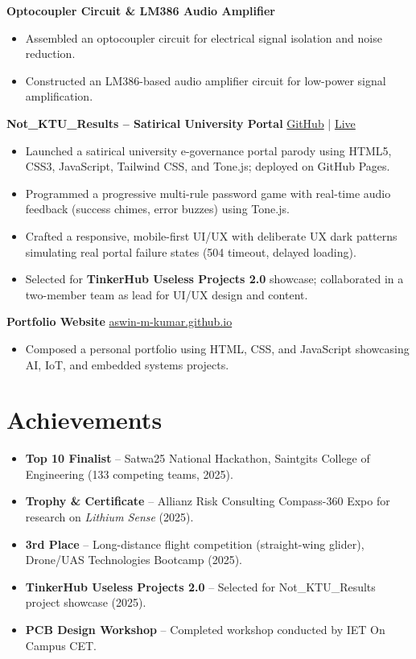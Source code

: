 \documentclass[a4paper,11pt]{article}
\begin{document}
\vspace{4pt}
\noindent
\textbf{Optocoupler Circuit \& LM386 Audio Amplifier}
\begin{itemize}
  \item Assembled an optocoupler circuit for electrical signal isolation and noise reduction.
  \item Constructed an LM386-based audio amplifier circuit for low-power signal amplification.
\end{itemize}

\vspace{4pt}
\noindent
\textbf{Not\_KTU\_Results -- Satirical University Portal} \hfill \href{https://github.com/aswin-m-kumar/Not_KTU_Results}{GitHub} \;|\; \href{https://aswin-m-kumar.github.io/Not_KTU_Results/}{Live}
\begin{itemize}
  \item Launched a satirical university e-governance portal parody using HTML5, CSS3, JavaScript, Tailwind CSS, and Tone.js; deployed on GitHub Pages.
  \item Programmed a progressive multi-rule password game with real-time audio feedback (success chimes, error buzzes) using Tone.js.
  \item Crafted a responsive, mobile-first UI/UX with deliberate UX dark patterns simulating real portal failure states (504 timeout, delayed loading).
  \item Selected for \textbf{TinkerHub Useless Projects 2.0} showcase; collaborated in a two-member team as lead for UI/UX design and content.
\end{itemize}

\vspace{4pt}
\noindent
\textbf{Portfolio Website} \hfill \href{https://aswin-m-kumar.github.io}{aswin-m-kumar.github.io}
\begin{itemize}
  \item Composed a personal portfolio using HTML, CSS, and JavaScript showcasing AI, IoT, and embedded systems projects.
\end{itemize}


\section{Achievements}

\begin{itemize}
  \item \textbf{Top 10 Finalist} -- Satwa25 National Hackathon, Saintgits College of Engineering (133 competing teams, 2025).
  \item \textbf{Trophy \& Certificate} -- Allianz Risk Consulting Compass-360 Expo for research on \textit{Lithium Sense} (2025).
  \item \textbf{3rd Place} -- Long-distance flight competition (straight-wing glider), Drone/UAS Technologies Bootcamp (2025).
  \item \textbf{TinkerHub Useless Projects 2.0} -- Selected for Not\_KTU\_Results project showcase (2025).
  \item \textbf{PCB Design Workshop} -- Completed workshop conducted by IET On Campus CET.
\end{itemize}
\end{document}

